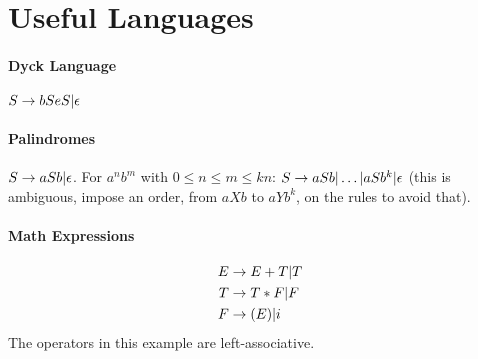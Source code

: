 \section{Useful Languages}

\paragraph{Dyck Language} $S \rightarrow bSeS | \epsilon$
\paragraph{Palindromes} $S \rightarrow aSb | \epsilon$.
For $a^nb^m$ with $0 \le n \le m \le kn$: $S \rightarrow aSb | \ldots | aSb^k | \epsilon$ (this is ambiguous, impose an order, from $aXb$ to $aYb^k$, on the rules to avoid that).
\paragraph{Math Expressions}
\begin{align*}
    E &\rightarrow E + T | T \\
    T &\rightarrow T * F | F \\
    F &\rightarrow (E) | i
\end{align*}
The operators in this example are left-associative.
